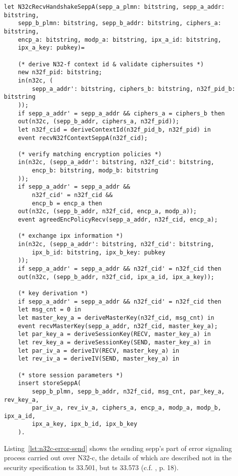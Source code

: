 \begin{lstlisting}[caption={Definition of the receiving N32-c handshake process},label={lst:n32c-handshake-recv},firstnumber=356]
let N32cRecvHandshakeSeppA(sepp_a_plmn: bitstring, sepp_a_addr: bitstring,
    sepp_b_plmn: bitstring, sepp_b_addr: bitstring, ciphers_a: bitstring,
    encp_a: bitstring, modp_a: bitstring, ipx_a_id: bitstring,
    ipx_a_key: pubkey)=

    (* derive N32-f context id & validate ciphersuites *)
    new n32f_pid: bitstring;
    in(n32c, (
        sepp_a_addr': bitstring, ciphers_b: bitstring, n32f_pid_b: bitstring
    ));
    if sepp_a_addr' = sepp_a_addr && ciphers_a = ciphers_b then
    out(n32c, (sepp_b_addr, ciphers_a, n32f_pid));
    let n32f_cid = deriveContextId(n32f_pid_b, n32f_pid) in
    event recvN32fContextSeppA(n32f_cid);

    (* verify matching encryption policies *)
    in(n32c, (sepp_a_addr': bitstring, n32f_cid': bitstring,
        encp_b: bitstring, modp_b: bitstring
    ));
    if sepp_a_addr' = sepp_a_addr &&
        n32f_cid' = n32f_cid &&
        encp_b = encp_a then
    out(n32c, (sepp_b_addr, n32f_cid, encp_a, modp_a));
    event agreedEncPolicyRecv(sepp_a_addr, n32f_cid, encp_a);

    (* exchange ipx information *)
    in(n32c, (sepp_a_addr': bitstring, n32f_cid': bitstring,
        ipx_b_id: bitstring, ipx_b_key: pubkey
    ));
    if sepp_a_addr' = sepp_a_addr && n32f_cid' = n32f_cid then
    out(n32c, (sepp_b_addr, n32f_cid, ipx_a_id, ipx_a_key));

    (* key derivation *)
    if sepp_a_addr' = sepp_a_addr && n32f_cid' = n32f_cid then
    let msg_cnt = 0 in
    let master_key_a = deriveMasterKey(n32f_cid, msg_cnt) in
    event recvMasterKey(sepp_a_addr, n32f_cid, master_key_a);
    let par_key_a = deriveSessionKey(RECV, master_key_a) in
    let rev_key_a = deriveSessionKey(SEND, master_key_a) in
    let par_iv_a = deriveIV(RECV, master_key_a) in
    let rev_iv_a = deriveIV(SEND, master_key_a) in

    (* store session parameters *)
    insert storeSeppA(
        sepp_b_plmn, sepp_b_addr, n32f_cid, msg_cnt, par_key_a, rev_key_a,
        par_iv_a, rev_iv_a, ciphers_a, encp_a, modp_a, modp_b, ipx_a_id,
        ipx_a_key, ipx_b_id, ipx_b_key
    ).
\end{lstlisting}

Listing~\ref{lst:n32c-error-send} shows the sending \gls{sepp}'s part of error signaling process carried out over N32-c, the details of which are described not in the security specification \gls{ts} 33.501, but \gls{ts} 33.573 (c.f. \cite{3gpp.29.573}, p. 18).

